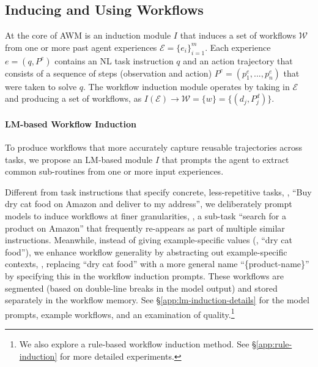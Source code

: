 \subsection{Inducing and Using Workflows}
\label{sec:3.3:atm}
At the core of AWM is an induction module $I$ that induces a set of workflows $\mathcal{W}$ from one or more past agent experiences $\mathcal{E} = \{e_i\}_{i=1}^{m}$. Each experience $e = (q, P^e)$ contains an NL task instruction $q$ and an action trajectory that consists of a sequence of steps (observation and action) $P^e = (p^e_1, ..., p^e_n)$ that were taken to solve $q$. The workflow induction module operates by taking in $\mathcal{E}$ and producing a set of workflows, as $I(\mathcal{E}) \rightarrow \mathcal{W} = \{w\} = \{(d_j, P_j^d)\}$.

\vspace{-2mm}
\paragraph{LM-based Workflow Induction}
To produce workflows that more accurately capture reusable trajectories across tasks, we propose an LM-based module $I$ that prompts the agent to extract common sub-routines from one or more input experiences. 

Different from task instructions that specify concrete, less-repetitive tasks, \eg, ``Buy dry cat food on Amazon and deliver to my address'', we deliberately prompt models to induce workflows at finer granularities, \ie, a sub-task ``search for a product on Amazon'' that frequently re-appears as part of multiple similar instructions.
Meanwhile, instead of giving example-specific values (\eg, ``dry cat food''), we enhance workflow generality by abstracting out example-specific contexts, \ie, replacing ``dry cat food'' with a more general name ``\{product-name\}'' by specifying this in the workflow induction prompts. 
These workflows are segmented (based on double-line breaks in the model output) and stored separately in the workflow memory.
See \S\ref{app:lm-induction-details} for the model prompts, example workflows, and an examination of quality.\footnote{We also explore a rule-based workflow induction method. See \S\ref{app:rule-induction} for more detailed experiments.}


